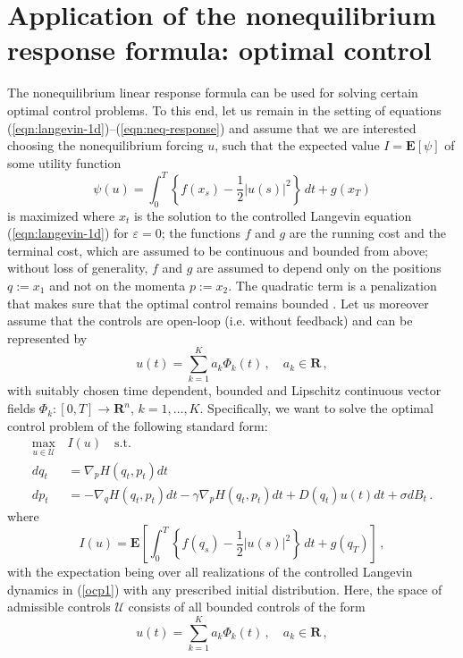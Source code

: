 \documentclass[]{tMPH2e}
\newcommand{\R}{{\mathbf R}}
\newcommand{\eps}{\varepsilon}
\newcommand{\cU}{\mathcal U}
\newcommand{\bE}{{\mathbf E}}
\begin{document}
\section{Application of the nonequilibrium response formula: optimal control}

The nonequilibrium linear response formula can be used for solving certain optimal control problems. To this end, let us remain in the setting of equations (\ref{eqn:langevin-1d})--(\ref{eqn:neq-response}) and assume that we are interested choosing the nonequilibrium forcing $u$, such that the expected value $I=\bE[\psi]$ of some utility function 
\[
\psi(u) = \int_{0}^{T}\left\{f(x_{s}) - \frac{1}{2}|u(s)|^{2}\right\}\,dt + g(x_{T}) 
\]
is maximized where $x_{t}$ is the solution to the controlled Langevin equation (\ref{eqn:langevin-1d}) for $\eps=0$; the functions $f$ and $g$ are the running cost and the terminal cost, which are assumed to be continuous and bounded from above; without loss of generality, $f$ and $g$ are assumed to depend only on the positions $q:=x_{1}$ and not on the momenta $p:=x_{2}$. The quadratic term is a penalization that makes sure that the optimal control remains bounded \cite{schuette2012,hartmann2012}. Let us moreover assume that the controls are open-loop (i.e. without feedback) and can be represented by 
\[
u(t) = \sum_{k=1}^K a_k \Phi_k(t)\,,\quad a_{k}\in \R\,,
\]
with suitably chosen time dependent, bounded and Lipschitz continuous vector fields $\Phi_k\colon[0,T]\to\R^{n}$, $k=1,\ldots,K$. %
Specifically, we want to solve the optimal control problem of the following standard form: 
\begin{equation}\label{ocp1}
\begin{aligned}
 \max_{u\in\cU} \,& I(u)\quad \textrm{s.t.}\\
dq_t & =  \nabla_p H(q_t,p_t)dt\\
dp_t & =  -\nabla_q H(q_t,p_t)dt - \gamma \nabla_p H(q_t,p_t)dt + D(q_t)u(t) dt+\sigma dB_t\,.
\end{aligned}
\end{equation}
where 
\begin{equation}\label{ocp2}
I(u) = \bE\left[\int_{0}^{T}\left\{f(q_{s}) - \frac{1}{2}|u(s)|^{2}\right\}\,dt + g(q_{T}) \right]\,,
\end{equation}
with the expectation being over all realizations of the controlled Langevin dynamics in (\ref{ocp1}) with any prescribed initial distribution. Here, the space of admissible controls $\cU$ consists of all bounded controls of the form 
\begin{equation}\label{admissible}
u(t) = \sum_{k=1}^K a_k \Phi_k(t)\,,\quad a_{k}\in \R\,,
\end{equation}
\end{document}
